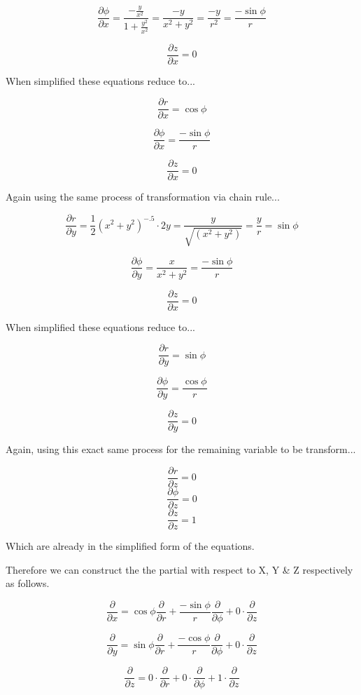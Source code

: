 \documentclass[12pt]{article}
\begin{document}
\[ \frac{\partial{\phi}}{\partial{x}} = \frac{-\frac{y}{x^2}}{1 + \frac{y^2}{x^2}} = \frac{-y}{x^2 + y^2} = \frac{-y}{r^2} = \frac{-\sin{\phi}}{r}\]

\[ \frac{\partial{z}}{\partial{x}} = 0 \]

When simplified these equations reduce to...

\[ \frac{\partial{r}}{\partial{x}} = \cos{\phi}\]

\[ \frac{\partial{\phi}}{\partial{x}} = \frac{-\sin{\phi}}{r}\]

\[ \frac{\partial{z}}{\partial{x}} = 0 \]

Again using the same process of transformation via chain rule...

\[ \frac{\partial{r}}{\partial{y}} = \frac{1}{2}(x^2 + y^2)^{-.5} \cdot 2y = \frac{y}{\sqrt{(x^2 + y^2)}} = \frac{y}{r} = \sin{\phi}\]

\[ \frac{\partial{\phi}}{\partial{y}} = \frac{x}{x^2 + y^2} = \frac{-\sin{\phi}}{r}\]

\[ \frac{\partial{z}}{\partial{x}} = 0 \]


When simplified these equations reduce to...

\[ \frac{\partial{r}}{\partial{y}} = \sin{\phi}\]

\[ \frac{\partial{\phi}}{\partial{y}} = \frac{\cos{\phi}}{r}\]

\[ \frac{\partial{z}}{\partial{y}} = 0 \]

Again, using this exact same process for the remaining variable to be transform...

\[ \frac{\partial{r}}{\partial{z}} = 0\]
\[ \frac{\partial{\phi}}{\partial{z}} = 0\]
\[ \frac{\partial{z}}{\partial{z}} = 1\]

Which are already in the simplified form of the equations.

Therefore we can construct the the partial with respect to X, Y \& Z respectively as follows.

\[ \frac{\partial{}}{\partial{x}} = \cos{\phi}\frac{\partial{}}{\partial{r}} + \frac{-\sin{\phi}}{r} \frac{\partial{}}{\partial{\phi}} + 0\cdot \frac{\partial{}}{\partial{z}}  \]

\[ \frac{\partial{}}{\partial{y}} = \sin{\phi}\frac{\partial{}}{\partial{r}} + \frac{-\cos{\phi}}{r} \frac{\partial{}}{\partial{\phi}} + 0\cdot \frac{\partial{}}{\partial{z}}  \]

\[ \frac{\partial{}}{\partial{z}} = 0\cdot\frac{\partial{}}{\partial{r}} + 0\cdot \frac{\partial{}}{\partial{\phi}} + 1 \cdot \frac{\partial{}}{\partial{z}}  \]
\end{document}
